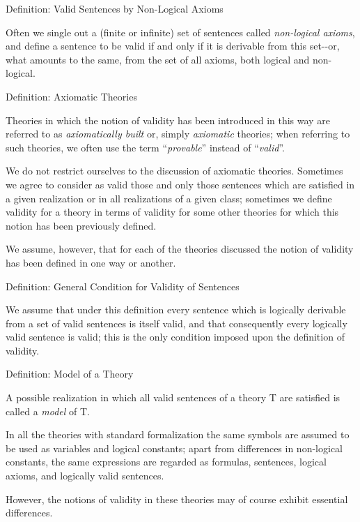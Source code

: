\protect\hypertarget{anchor-23}{}{}Definition: Valid Sentences by
Non-Logical Axioms

Often we single out a (finite or infinite) set of sentences called
\emph{non-logical axioms}, and define a sentence to be valid if and only
if it is derivable from this set-\/-or, what amounts to the same, from
the set of all axioms, both logical and non-logical.

\protect\hypertarget{anchor-24}{}{}

\protect\hypertarget{anchor-25}{}{}Definition: Axiomatic Theories

Theories in which the notion of validity has been introduced in this way
are referred to as \emph{axiomatically built} or, simply
\emph{axiomatic} theories; when referring to such theories, we often use
the term ``\emph{provable}'' instead of ``\emph{valid}''.

We do not restrict ourselves to the discussion of axiomatic theories.
Sometimes we agree to consider as valid those and only those sentences
which are satisfied in a given realization or in all realizations of a
given class; sometimes we define validity for a theory in terms of
validity for some other theories for which this notion has been
previously defined.

We assume, however, that for each of the theories discussed the notion
of validity has been defined in one way or another.

\protect\hypertarget{anchor-26}{}{}Definition: General Condition for
Validity of Sentences

We assume that under this definition every sentence which is logically
derivable from a set of valid sentences is itself valid, and that
consequently every logically valid sentence is valid; this is the only
condition imposed upon the definition of validity.

\protect\hypertarget{anchor-27}{}{}Definition: Model of a Theory

A possible realization in which all valid sentences of a theory T are
satisfied is called a \emph{model} of T.

In all the theories with standard formalization the same symbols are
assumed to be used as variables and logical constants; apart from
differences in non-logical constants, the same expressions are regarded
as formulas, sentences, logical axioms, and logically valid sentences.

However, the notions of validity in these theories may of course exhibit
essential differences.

